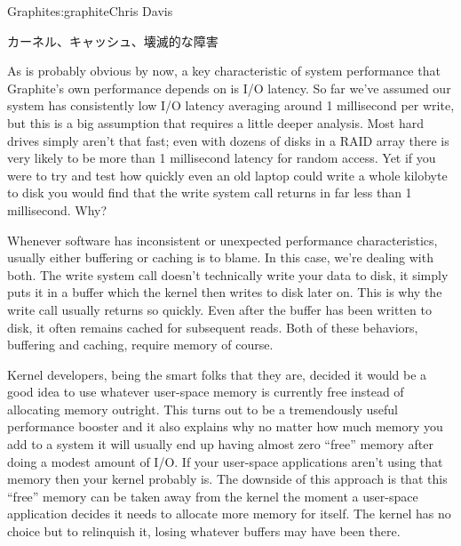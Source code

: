 \begin{aosachapter}{Graphite}{s:graphite}{Chris Davis}
\vspace{-0.1cm} %

\begin{aosasect1}{カーネル、キャッシュ、壊滅的な障害}

\vspace{-0.1cm} %

As is probably obvious by now, a key characteristic of system
performance that Graphite's own performance depends on is I/O latency.
So far we've assumed our system has consistently low I/O latency
averaging around 1 millisecond per write, but this is a big assumption
that requires a little deeper analysis. Most hard drives simply aren't
that fast; even with dozens of disks in a RAID array there is very
likely to be more than 1 millisecond latency for random access. Yet if
you were to try and test how quickly even an old laptop could write a
whole kilobyte to disk you would find that the write system call
returns in far less than 1 millisecond. Why?

Whenever software has inconsistent or unexpected performance
characteristics, usually either buffering or caching is to blame. In
this case, we're dealing with both. The write system call doesn't
technically write your data to disk, it simply puts it in a buffer
which the kernel then writes to disk later on. This is why the write
call usually returns so quickly. Even after the buffer has been
written to disk, it often remains cached for subsequent reads. Both of
these behaviors, buffering and caching, require memory of
course.

Kernel developers, being the smart folks that they are, decided it
would be a good idea to use whatever user-space memory is currently
free instead of allocating memory outright. This turns out to be a
tremendously useful performance booster and it also explains why no
matter how much memory you add to a system it will usually end up
having almost zero ``free'' memory after doing a modest amount of
I/O\@. If your user-space applications aren't using that memory then
your kernel probably is. The downside of this approach is that this
``free'' memory can be taken away from the kernel the moment a
user-space application decides it needs to allocate more memory for
itself. The kernel has no choice but to relinquish it, losing whatever
buffers may have been there.


\end{aosasect1}
\end{aosachapter}
